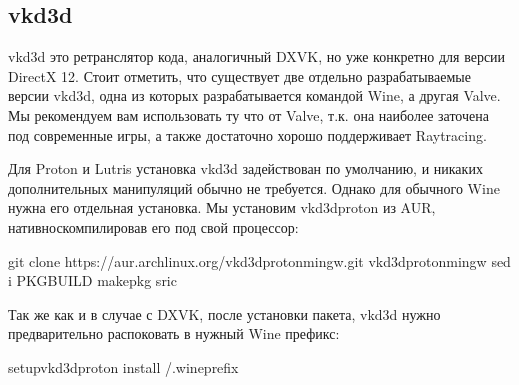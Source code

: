 \documentclass[letterpaper,10pt,russian,openany]{sphinxmanual}
\begin{document}
\ignorespaces 

\subsection{vkd3d}
\label{\detokenize{source/linux-gaming:vkd3d}}\label{\detokenize{source/linux-gaming:index-10}}\label{\detokenize{source/linux-gaming:id10}}
\sphinxAtStartPar
vkd3d \sphinxhyphen{} это ретранслятор кода, аналогичный DXVK, но уже конкретно для версии DirectX 12.
Стоит отметить, что существует две отдельно разрабатываемые версии vkd3d,
одна из которых разрабатывается командой Wine, а другая \sphinxhyphen{} Valve.
Мы рекомендуем вам использовать ту что от Valve, т.к. она наиболее заточена под современные игры,
а также достаточно хорошо поддерживает Raytracing.

\sphinxAtStartPar
{}

\sphinxAtStartPar
Для Proton и Lutris установка vkd3d задействован по умолчанию, и никаких дополнительных манипуляций обычно не требуется.
Однако для обычного Wine нужна его отдельная установка. Мы установим vkd3d\sphinxhyphen{}proton из AUR, нативно\sphinxhyphen{}скомпилировав его под свой процессор:

\begin{sphinxVerbatim}[commandchars=\\\{\}]
git clone https://aur.archlinux.org/vkd3d\PYGZhy{}proton\PYGZhy{}mingw.git 
 vkd3d\PYGZhy{}proton\PYGZhy{}mingw                                      
sed \PYGZhy{}i  PKGBUILD 
makepkg \PYGZhy{}sric                                              
\end{sphinxVerbatim}

\sphinxAtStartPar
Так же как и в случае с DXVK, после установки пакета, vkd3d нужно предварительно распоковать в нужный Wine префикс:

\begin{sphinxVerbatim}[commandchars=\\\{\}]
setup\PYGZus{}vkd3d\PYGZus{}proton install \PYGZti{}/.wineprefix
\end{sphinxVerbatim}
\end{document}
